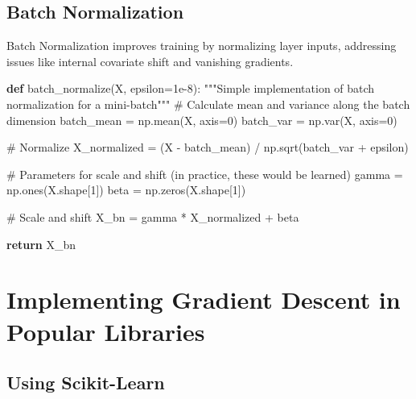 \documentclass[
  letterpaper,
  DIV=11,
  numbers=noendperiod]{scrreprt}
\newenvironment{Shaded}{\begin{snugshade}}{\end{snugshade}}
\newcommand{\CommentTok}[1]{\textcolor[rgb]{0.37,0.37,0.37}{#1}}
\newcommand{\ControlFlowTok}[1]{\textcolor[rgb]{0.00,0.23,0.31}{\textbf{#1}}}
\newcommand{\DecValTok}[1]{\textcolor[rgb]{0.68,0.00,0.00}{#1}}
\newcommand{\FloatTok}[1]{\textcolor[rgb]{0.68,0.00,0.00}{#1}}
\newcommand{\KeywordTok}[1]{\textcolor[rgb]{0.00,0.23,0.31}{\textbf{#1}}}
\newcommand{\NormalTok}[1]{\textcolor[rgb]{0.00,0.23,0.31}{#1}}
\newcommand{\OperatorTok}[1]{\textcolor[rgb]{0.37,0.37,0.37}{#1}}
\begin{document}
\section{Batch Normalization}\label{batch-normalization}

Batch Normalization improves training by normalizing layer inputs,
addressing issues like internal covariate shift and vanishing gradients.

\begin{Shaded}
\begin{Highlighting}[]
\KeywordTok{def}\NormalTok{ batch\_normalize(X, epsilon}\OperatorTok{=}\FloatTok{1e{-}8}\NormalTok{):}
    \CommentTok{"""Simple implementation of batch normalization for a mini{-}batch"""}
    \CommentTok{\# Calculate mean and variance along the batch dimension}
\NormalTok{    batch\_mean }\OperatorTok{=}\NormalTok{ np.mean(X, axis}\OperatorTok{=}\DecValTok{0}\NormalTok{)}
\NormalTok{    batch\_var }\OperatorTok{=}\NormalTok{ np.var(X, axis}\OperatorTok{=}\DecValTok{0}\NormalTok{)}
    
    \CommentTok{\# Normalize}
\NormalTok{    X\_normalized }\OperatorTok{=}\NormalTok{ (X }\OperatorTok{{-}}\NormalTok{ batch\_mean) }\OperatorTok{/}\NormalTok{ np.sqrt(batch\_var }\OperatorTok{+}\NormalTok{ epsilon)}
    
    \CommentTok{\# Parameters for scale and shift (in practice, these would be learned)}
\NormalTok{    gamma }\OperatorTok{=}\NormalTok{ np.ones(X.shape[}\DecValTok{1}\NormalTok{])}
\NormalTok{    beta }\OperatorTok{=}\NormalTok{ np.zeros(X.shape[}\DecValTok{1}\NormalTok{])}
    
    \CommentTok{\# Scale and shift}
\NormalTok{    X\_bn }\OperatorTok{=}\NormalTok{ gamma }\OperatorTok{*}\NormalTok{ X\_normalized }\OperatorTok{+}\NormalTok{ beta}
    
    \ControlFlowTok{return}\NormalTok{ X\_bn}
\end{Highlighting}
\end{Shaded}


\chapter{Implementing Gradient Descent in Popular
Libraries}\label{implementing-gradient-descent-in-popular-libraries}

\section{Using Scikit-Learn}\label{using-scikit-learn}
\end{document}

